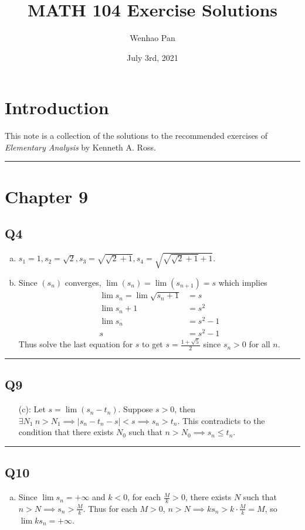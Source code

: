 \documentclass[12pt, lettersize]{article}
\title{MATH 104 Exercise Solutions}
\author{Wenhao Pan}
\date{July 3rd, 2021}
\newcommand{\lline}{\noindent\rule{\textwidth}{1pt}}
\begin{document}
	
	\maketitle
	
	\section*{Introduction}
	This note is a collection of the solutions to the recommended exercises of \textit{Elementary Analysis} by Kenneth A. Ross.	
	
	\lline
	
	\section*{Chapter 9}
	\subsection*{Q4}
	\begin{enumerate}[(a)]
		\item $s_1=1, s_2=\sqrt{2}, s_3=\sqrt{\sqrt{2}+1}, s_4=\sqrt{\sqrt{\sqrt{2}+1}+1}$.
		\item Since $(s_n)$ converges, $\lim (s_n)=\lim (s_{n+1})=s$ which implies
		\begin{align*}
			\lim s_n=\lim\sqrt{s_n+1} &= s\\
					 \lim s_n+1 &= s^2\\
					 \lim s_n &= s^2-1\\
					 s &= s^2-1
		\end{align*}
		Thus solve the last equation for $s$ to get $s=\frac{1+\sqrt{5}}{2}$ since $s_n>0$ for all $n$.
	\end{enumerate}
	
	\lline
	
	\subsection*{Q9}
	\begin{enumerate}
		\item[(c):] Let $s=\lim(s_n-t_n)$. Suppose $s>0$, then $\exists N_1\ n>N_1\implies |s_n-t_n-s|<s\implies s_n>t_n$. This contradicts to the condition that there exists $N_0$ such that $n>N_0\implies s_n\leq t_n$.  
	\end{enumerate}
	
	\lline
	
	\subsection*{Q10}
	\begin{enumerate}[(a)]
		\item Since $\lim s_n=+\infty$ and $k<0$, for each $\frac{M}{k}>0$, there exists $N$ such that $n>N\implies s_n>\frac{M}{k}$. Thus for each $M>0$, $n>N\implies ks_n>k\cdot\frac{M}{k}=M$, so $\lim ks_n=+\infty$.
	\end{enumerate}
\end{document}
